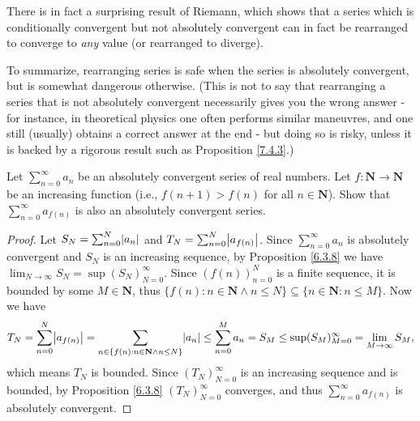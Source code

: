 \begin{note}
There is in fact a surprising result of Riemann, which shows that a series which is conditionally convergent but not absolutely convergent can in fact be rearranged to converge to \emph{any} value
(or rearranged to diverge).
\end{note}

\begin{note}
To summarize, rearranging series is safe when the series is absolutely convergent, but is somewhat dangerous otherwise.
(This is not to say that rearranging a series that is not absolutely convergent necessarily gives you the wrong answer
- for instance, in theoretical physics one often performs similar maneuvres, and one still (usually) obtains a correct answer at the end
- but doing so is risky, unless it is backed by a rigorous result such as Proposition \ref{7.4.3}.)
\end{note}

\exercisesection

\begin{exercise}\label{ex 7.4.1}
Let \(\sum_{n = 0}^\infty a_n\) be an absolutely convergent series of real numbers.
Let \(f : \mathbf{N} \to \mathbf{N}\) be an increasing function (i.e., \(f(n + 1) > f(n)\) for all \(n \in \mathbf{N}\)).
Show that \(\sum_{n = 0}^\infty a_{f(n)}\) is also an absolutely convergent series.
\end{exercise}

\begin{proof}
Let \(S_N = \sum_{n = 0}^N \abs*{a_n}\) and \(T_N = \sum_{n = 0}^N \abs*{a_{f(n)}}\).
Since \(\sum_{n = 0}^\infty a_n\) is absolutely convergent and \(S_N\) is an increasing sequence, by Proposition \ref{6.3.8} we have \(\lim_{N \to \infty} S_N = \sup(S_N)_{N = 0}^\infty\).
Since \((f(n))_{n = 0}^N\) is a finite sequence, it is bounded by some \(M \in \mathbf{N}\), thus \(\{f(n) : n \in \mathbf{N} \land n \leq N\} \subseteq \{n \in \mathbf{N} : n \leq M\}\).
Now we have
\[
    T_N = \sum_{n = 0}^N \abs*{a_{f(n)}} = \sum_{n \in \{f(n) : n \in \mathbf{N} \land n \leq N\}} \abs*{a_n} \leq \sum_{n = 0}^M a_n = S_M \leq \sup(S_M)_{M = 0}^\infty = \lim_{M \to \infty} S_M,
\]
which means \(T_N\) is bounded.
Since \((T_N)_{N = 0}^\infty\) is an increasing sequence and is bounded, by Proposition \ref{6.3.8} \((T_N)_{N = 0}^\infty\) converges, and thus \(\sum_{n = 0}^\infty a_{f(n)}\) is absolutely convergent.
\end{proof}